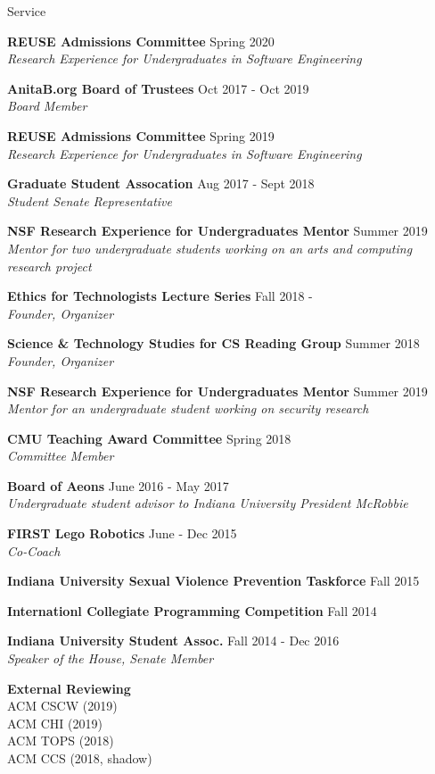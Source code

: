 \documentclass{resume} %
\begin{document}
\newpage
\begin{rSection}{Service}
	
	{\bf REUSE Admissions Committee} \hfill Spring 2020 \\ 
	\textit{Research Experience for Undergraduates in Software Engineering}

	{\bf AnitaB.org Board of Trustees} \hfill Oct 2017 - Oct 2019\\ 
	\textit{Board Member} 

	{\bf REUSE Admissions Committee} \hfill Spring 2019 \\ 
	\textit{Research Experience for Undergraduates in Software Engineering}
	
	{\bf Graduate Student Assocation} \hfill Aug 2017 - Sept 2018 \\ 
	\textit{Student Senate Representative} 

	{\bf NSF Research Experience for Undergraduates Mentor} \hfill Summer 2019 \\ 
	\textit{Mentor for two undergraduate students working on an arts and computing research project} 

	{\bf Ethics for Technologists Lecture Series} \hfill Fall 2018 - \\ 
	\textit{Founder, Organizer} 

	{\bf Science \& Technology Studies for CS Reading Group} \hfill Summer 2018 \\ 
	\textit{Founder, Organizer} 
	
	{\bf NSF Research Experience for Undergraduates Mentor} \hfill Summer 2019 \\ 
	\textit{Mentor for an undergraduate student working on security research} 
	
	{\bf CMU Teaching Award Committee} \hfill Spring 2018 \\ 
	\textit{Committee Member} 

	{\bf Board of Aeons} \hfill June 2016 - May 2017 \\
	\textit{Undergraduate student advisor to Indiana University President McRobbie}

	{\bf FIRST Lego Robotics} \hfill June - Dec 2015 \\ 
	\textit{Co-Coach}

	{\bf Indiana University Sexual Violence Prevention Taskforce} \hfill Fall 2015  

	{\bf Internationl Collegiate Programming Competition} \hfill Fall 2014 

	{\bf Indiana University Student Assoc.} \hfill Fall 2014 - Dec 2016 \\ 
	\textit{Speaker of the House, Senate Member} 


	{\bf External Reviewing} \\ 
	ACM CSCW (2019) \\
	ACM CHI (2019) \\
	ACM TOPS (2018) \\
	ACM CCS (2018, shadow) \\
\end{rSection}
\end{document}
